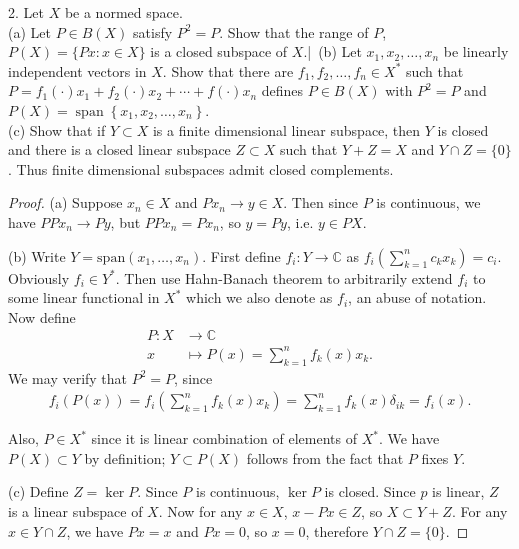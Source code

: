 \newpage
\begin{problem}
	2. Let $X$ be a normed space.\\
(a) Let $P \in B(X)$ satisfy $P^2=P$. Show that the range of $P$, $P(X)=\{P x: x \in X\}$ is a closed subspace of $X$.|\
(b) Let $x_1, x_2, \ldots, x_n$ be linearly independent vectors in $X$. Show that there are $f_1, f_2, \ldots, f_n \in X^*$ such that $P=f_1(\cdot) x_1+f_2(\cdot) x_2+\cdots+f(\cdot) x_n$ defines $P \in B(X)$ with $P^2=P$ and $P(X)=\operatorname{span}\left\{x_1, x_2, \ldots, x_n\right\}$.\\
(c) Show that if $Y \subset X$ is a finite dimensional linear subspace, then $Y$ is closed and there is a closed linear subspace $Z \subset X$ such that $Y+Z=X$ and $Y \cap Z=\{0\}$. Thus finite dimensional subspaces admit closed complements.
\end{problem}
\begin{proof}
	(a) Suppose $x_n \in X$ and $Px_n \to y \in X$. Then since $P$ is continuous, we have $PP x_n \to Py$, but $PP x_n = P x_n$, so $y = Py$, i.e. $y \in PX$.

	(b) Write $Y = \text{span}(x_1, \ldots, x_n)$. First define  $f_i: Y \to \mathbb{C}$ as $f_i\left( \sum_{k = 1}^n c_k x_k \right) = c_i$. Obviously $f_i \in Y^*$. Then use Hahn-Banach theorem to arbitrarily extend $f_i$ to some linear functional in $X^*$ which we also denote as $f_i$, an abuse of notation. Now define
	\begin{align*}
		P: X &\longrightarrow \mathbb{C} \\
		x &\longmapsto P(x) = \sum_{k = 1}^n f_k(x) x_k
	.\end{align*}
	We may verify that $P^2 = P$, since
	\begin{align*}
		f_i(P(x)) = f_i(\sum_{k = 1}^n f_k(x) x_k) = \sum_{k = 1}^n f_k(x) \delta_{i k} = f_i(x)
	.\end{align*}

	Also, $P \in X^*$ since it is linear combination of elements of $X^*$. We have $P(X) \subset Y$ by definition; $Y \subset P(X)$ follows from the fact that $P$ fixes $Y$.

	(c) Define $Z = \operatorname{ker} P$. Since $P$ is continuous, $\operatorname{ker} P$ is closed. Since $p$ is linear, $Z$ is a linear subspace of $X$. Now for any $x \in X$, $x - P x \in Z$, so $X \subset Y + Z$. For any $x \in Y \cap Z$, we have $P x = x$ and $P x = 0$, so $x = 0$, therefore $Y \cap Z = \{0\}$.
\end{proof}

